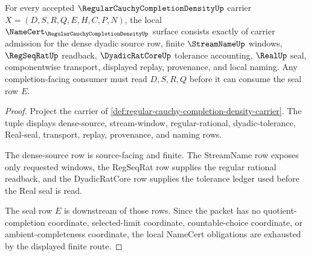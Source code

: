 \begin{theorem}
\label{thm:regular-cauchy-completion-density-namecert-obligations}
For every accepted $\RegularCauchyCompletionDensityUp$ carrier $X=(D,S,R,Q,E,H,C,P,N)$, the local $\NameCert_{\RegularCauchyCompletionDensityUp}$ surface consists exactly of carrier admission for the dense dyadic source row, finite $\StreamNameUp$ windows, $\RegSeqRatUp$ readback, $\DyadicRatCoreUp$ tolerance accounting, $\RealUp$ seal, componentwise transport, displayed replay, provenance, and local naming. Any completion-facing consumer must read $D,S,R,Q$ before it can consume the seal row $E$.
\end{theorem}
\begin{proof}
Project the carrier of \autoref{def:regular-cauchy-completion-density-carrier}. The tuple displays dense-source, stream-window, regular-rational, dyadic-tolerance, Real-seal, transport, replay, provenance, and naming rows.

The dense-source row is source-facing and finite. The StreamName row exposes only requested windows, the RegSeqRat row supplies the regular rational readback, and the DyadicRatCore row supplies the tolerance ledger used before the Real seal is read.

The seal row $E$ is downstream of those rows. Since the packet has no quotient-completion coordinate, selected-limit coordinate, countable-choice coordinate, or ambient-completeness coordinate, the local NameCert obligations are exhausted by the displayed finite route.
\end{proof}


